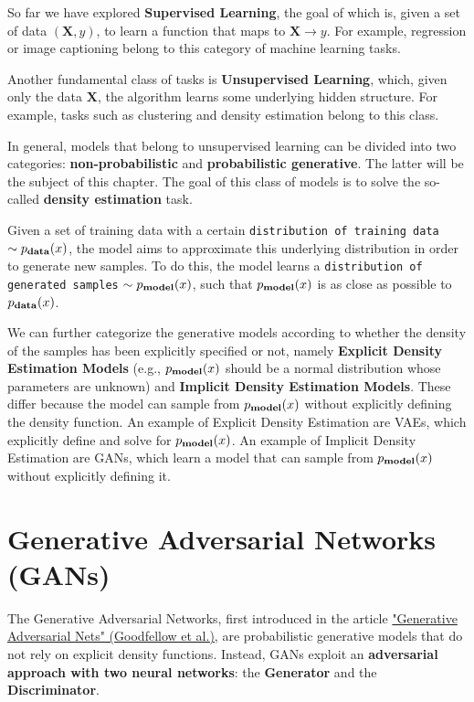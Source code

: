 So far we have explored \textbf{Supervised Learning}, the goal of which is, given a set of data \((\textbf{X}, y)\), to learn a function that maps to \(\textbf{X} \longrightarrow y\). For example, regression or image captioning belong to this category of machine learning tasks.

Another fundamental class of tasks is \textbf{Unsupervised Learning}, which, given only the data \(\textbf{X}\), the algorithm learns some underlying hidden structure. For example, tasks such as clustering and density estimation belong to this class.

In general, models that belong to unsupervised learning can be divided into two categories: \textbf{non-probabilistic} and \textbf{probabilistic generative}. The latter will be the subject of this chapter. The goal of this class of models is to solve the so-called \textbf{density estimation} task.

Given a set of training data with a certain \texttt{distribution of training data} \(\sim p_{\text{\textbf{data}}}(x)\), the model aims to approximate this underlying distribution in order to generate new samples. To do this, the model learns a \texttt{distribution of generated samples} \(\sim p_{\text{\textbf{model}}}(x)\), such that \(p_{\text{\textbf{model}}}(x)\) is as close as possible to \(p_{\text{\textbf{data}}}(x)\).

We can further categorize the generative models according to whether the density of the samples has been explicitly specified or not, namely \textbf{Explicit Density Estimation Models} (e.g., \(p_{\text{\textbf{model}}}(x)\) should be a normal distribution whose parameters are unknown) and \textbf{Implicit Density Estimation Models}. These differ because the model can sample from \(p_{\text{\textbf{model}}}(x)\) without explicitly defining the density function. An example of Explicit Density Estimation are VAEs, which explicitly define and solve for \(p_{\text{\textbf{model}}}(x)\). An example of Implicit Density Estimation are GANs, which learn a model that can sample from \(p_{\text{\textbf{model}}}(x)\) without explicitly defining it.

\section{Generative Adversarial Networks (GANs)}

The Generative Adversarial Networks, first introduced in the article \href{https://arxiv.org/pdf/1406.2661}{"Generative Adversarial Nets" (Goodfellow et al.)}, are probabilistic generative models that do not rely on explicit density functions. Instead, GANs exploit an \textbf{adversarial approach with two neural networks}: the \textbf{Generator} and the \textbf{Discriminator}.

